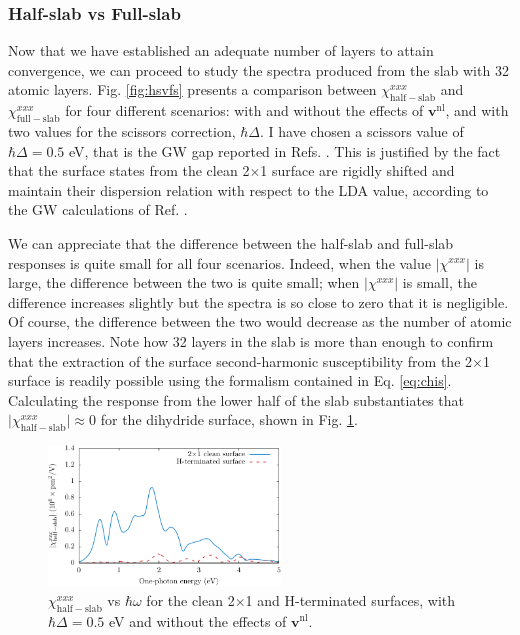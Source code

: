 \subsubsection{Half-slab vs Full-slab}

Now that we have established an adequate number of layers to attain convergence,
we can proceed to study the spectra produced from the slab with 32 atomic
layers. Fig. \ref{fig:hsvfs} presents a comparison between
$\chi^{xxx}_{\mathrm{half-slab}}$ and $\chi^{xxx}_{\mathrm{full-slab}}$ for four
different scenarios: with and without the effects of $\mathbf{v}^\mathrm{nl}$,
and with two values for the scissors correction, $\hbar\Delta$. I have chosen a
scissors value of $\hbar\Delta=0.5$ eV, that is the GW gap reported in Refs.
\cite{rohlfingPRB95, garciaCPC01}. This is justified by the fact that the
surface states from the clean 2$\times$1 surface are rigidly shifted and
maintain their dispersion relation with respect to the LDA value, according to
the GW calculations of Ref.
\cite{rohlfingPRB95}.

We can appreciate that the difference between the half-slab and full-slab
responses is quite small for all four scenarios. Indeed, when the value
$\vert\chi^{xxx}\vert$ is large, the difference between the two is quite small;
when $\vert\chi^{xxx}\vert$ is small, the difference increases slightly but the
spectra is so close to zero that it is negligible. Of course, the difference
between the two would decrease as the number of atomic layers increases. Note
how 32 layers in the slab is more than enough to confirm that the extraction of
the surface second-harmonic susceptibility from the 2$\times$1 surface is
readily possible using the formalism contained in Eq. \eqref{eq:chis}.
Calculating the response from the lower half of the slab substantiates that
$\vert\chi^{xxx}_{\mathrm{half-slab}}\vert\approx 0$ for the dihydride surface,
shown in Fig. \ref{fig:topvbottom}.

\begin{figure}[t]
\centering 
\includegraphics[width=0.55\textwidth]{content/figures/fig-Si2x1-topvbottom}
\caption[$\chi^{xxx}_{\mathrm{half-slab}}$ for the clean and H-terminated 
surfaces.]
{$\chi^{xxx}_{\mathrm{half-slab}}$ vs $\hbar\omega$ for the clean
2$\times$1 and H-terminated surfaces, with $\hbar\Delta = 0.5$ eV and without
the effects of $\mathbf{v}^\mathrm{nl}$.}
\label{fig:topvbottom}
\end{figure}

